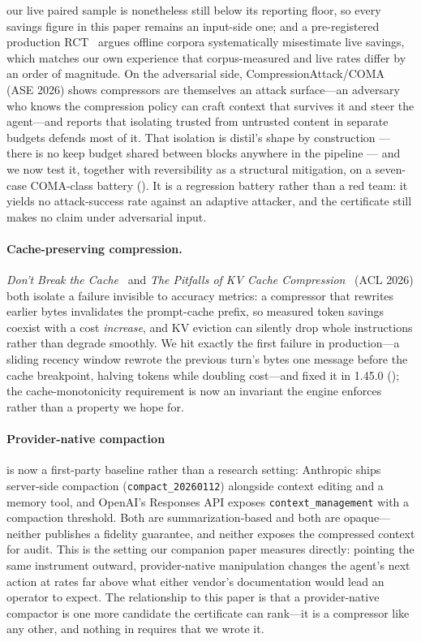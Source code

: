 \documentclass[11pt]{article}
\begin{document}
our live paired sample is nonetheless still below its reporting floor, so every savings
figure in this paper remains an input-side one; and a
pre-registered production RCT~\cite{prodrct} argues offline corpora systematically
misestimate live savings, which matches our own experience that corpus-measured and live
rates differ by an order of magnitude. On the adversarial side,
CompressionAttack/COMA~\cite{coma} (ASE 2026) shows compressors are themselves an attack
surface---an adversary who knows the compression policy can craft context that survives it
and steer the agent---and reports that isolating trusted from untrusted content in separate
budgets defends most of it. That isolation is distil's shape by construction --- there is no
keep budget shared between blocks anywhere in the pipeline --- and we now test it, together
with reversibility as a structural mitigation, on a seven-case COMA-class battery
(). It is a regression battery rather than a red team: it yields
no attack-success rate against an adaptive attacker, and the certificate still makes no claim
under adversarial input.

\paragraph{Cache-preserving compression.} \emph{Don't Break the Cache}~\cite{dontbreakcache}
and \emph{The Pitfalls of KV Cache Compression}~\cite{kvpitfalls} (ACL 2026) both isolate a
failure invisible to accuracy metrics: a compressor that rewrites earlier bytes invalidates
the prompt-cache prefix, so measured token savings coexist with a cost \emph{increase}, and
KV eviction can silently drop whole instructions rather than degrade smoothly. We hit
exactly the first failure in production---a sliding recency window rewrote the previous
turn's bytes one message before the cache breakpoint, halving tokens while doubling
cost---and fixed it in 1.45.0 (); the cache-monotonicity requirement is
now an invariant the engine enforces rather than a property we hope for.

\paragraph{Provider-native compaction} is now a first-party baseline rather than a research
setting: Anthropic ships server-side compaction (\texttt{compact\_20260112}) alongside
context editing and a memory tool, and OpenAI's Responses API exposes
\texttt{context\_management} with a compaction threshold. Both are summarization-based and
both are opaque---neither publishes a fidelity guarantee, and neither exposes the
compressed context for audit. This is the setting our companion paper measures directly:
pointing the same instrument outward, provider-native manipulation changes the agent's next
action at rates far above what either vendor's documentation would lead an operator to
expect. The relationship to this paper is that a provider-native compactor is one more
candidate the certificate can rank---it is a compressor like any other, and nothing in
 requires that we wrote it.
\end{document}
